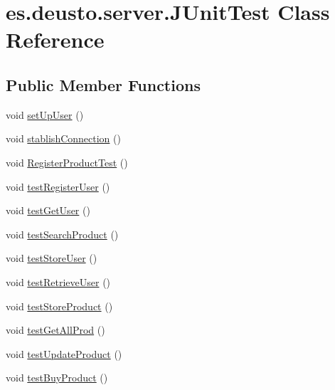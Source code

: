 \hypertarget{classes_1_1deusto_1_1server_1_1_j_unit_test}{}\section{es.\+deusto.\+server.\+J\+Unit\+Test Class Reference}
\label{classes_1_1deusto_1_1server_1_1_j_unit_test}
\subsection*{Public Member Functions}
\begin{DoxyCompactItemize}
\item 
void \hyperlink{classes_1_1deusto_1_1server_1_1_j_unit_test_a70ed61bac7b0101aed52c1ea8d2a58cf}{set\+Up\+User} ()
\item 
void \hyperlink{classes_1_1deusto_1_1server_1_1_j_unit_test_a2bdde69e0f41e4977c4ad76fa2cd0b95}{stablish\+Connection} ()
\item 
void \hyperlink{classes_1_1deusto_1_1server_1_1_j_unit_test_a11102e5000a6ff4c211c7243ab938117}{Register\+Product\+Test} ()
\item 
void \hyperlink{classes_1_1deusto_1_1server_1_1_j_unit_test_a0b87ea354f96ee4432cb5b5efd1604c5}{test\+Register\+User} ()
\item 
void \hyperlink{classes_1_1deusto_1_1server_1_1_j_unit_test_a534cdf24e98dd7d1d6a965e2f5ab75be}{test\+Get\+User} ()
\item 
void \hyperlink{classes_1_1deusto_1_1server_1_1_j_unit_test_a1a63f85e03a2c22d000ae9f3d2697159}{test\+Search\+Product} ()
\item 
void \hyperlink{classes_1_1deusto_1_1server_1_1_j_unit_test_a642a3012a65a9d81b891321efba4e2d3}{test\+Store\+User} ()
\item 
void \hyperlink{classes_1_1deusto_1_1server_1_1_j_unit_test_adce751e460d92b4bf6f82f246f552ab8}{test\+Retrieve\+User} ()
\item 
void \hyperlink{classes_1_1deusto_1_1server_1_1_j_unit_test_a47ec4408530333c9577359f7be9d78fa}{test\+Store\+Product} ()
\item 
void \hyperlink{classes_1_1deusto_1_1server_1_1_j_unit_test_a9a74c617f8cd970204919217df16090d}{test\+Get\+All\+Prod} ()
\item 
void \hyperlink{classes_1_1deusto_1_1server_1_1_j_unit_test_a6af88e3e3ad84aed02c23286c5d2a178}{test\+Update\+Product} ()
\item 
void \hyperlink{classes_1_1deusto_1_1server_1_1_j_unit_test_aeb535acfcc2efe9f6402d1d6c515d2d8}{test\+Buy\+Product} ()

\end{DoxyCompactItemize}
